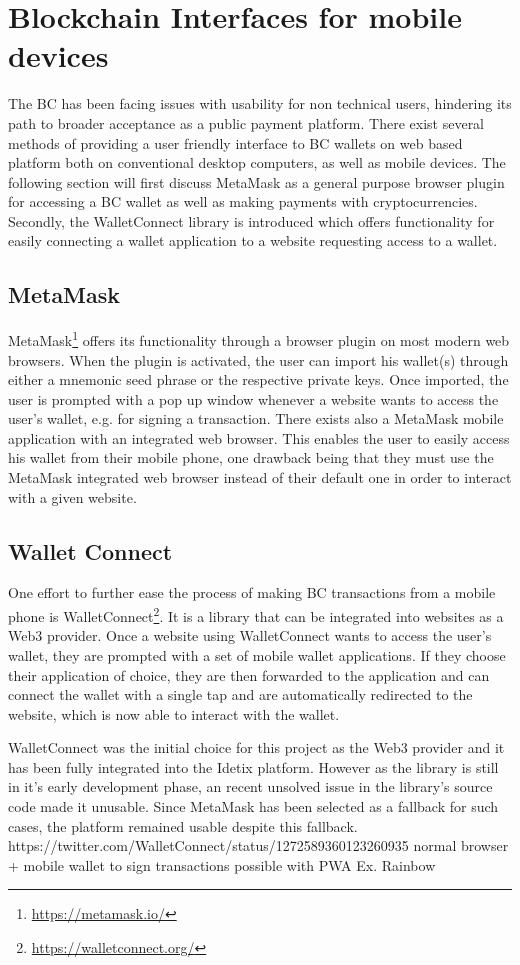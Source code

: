\section{Blockchain Interfaces for mobile devices}

The BC has been facing issues with usability for non technical users, hindering its path to broader acceptance as a public payment platform. There exist several methods of providing a user friendly interface to BC wallets on web based platform both on conventional desktop computers, as well as mobile devices. The following section will first discuss MetaMask as a general purpose browser plugin for accessing a BC wallet as well as making payments with cryptocurrencies. Secondly, the WalletConnect library is introduced which offers functionality for easily connecting a wallet application to a website requesting access to a wallet.

\subsection{MetaMask}
MetaMask\footnote{\url{https://metamask.io/}} offers its functionality through a browser plugin on most modern web browsers. When the plugin is activated, the user can import his wallet(s) through either a mnemonic seed phrase or the respective private keys. Once imported, the user is prompted with a pop up window whenever a website wants to access the user's wallet, e.g. for signing a transaction. There exists also a MetaMask mobile application with an integrated web browser. This enables the user to easily access his wallet from their mobile phone, one drawback being that they must use the MetaMask integrated web browser instead of their default one in order to interact with a given website. 

\subsection{Wallet Connect}
One effort to further ease the process of making BC transactions from a mobile phone is WalletConnect\footnote{\url{https://walletconnect.org/}}. It is a library that can be integrated into websites as a Web3 provider. Once a website using WalletConnect wants to access the user's wallet, they are prompted with a set of mobile wallet applications. If they choose their application of choice, they are then forwarded to the application and can connect the wallet with a single tap and are automatically redirected to the website, which is now able to interact with the wallet.

WalletConnect was the initial choice for this project as the Web3 provider and it has been fully integrated into the Idetix platform. However as the library is still in it's early development phase, an recent unsolved issue in the library's source code made it unusable. Since MetaMask has been selected as a fallback for such cases, the platform remained usable despite this fallback.
https://twitter.com/WalletConnect/status/1272589360123260935
normal browser + mobile wallet to sign transactions
possible with PWA
Ex. Rainbow


